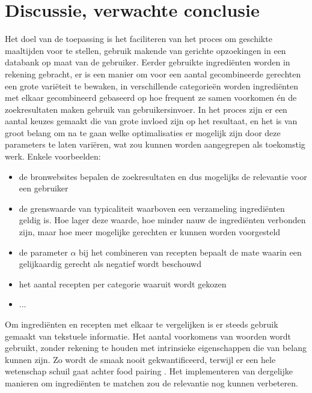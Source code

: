 \documentclass{hogent-article}
\begin{document}
\section{Discussie, verwachte conclusie}%
\label{sec:discussie-conclusie}

Het doel van de toepassing is het faciliteren van het proces om geschikte maaltijden voor te stellen, gebruik makende van gerichte opzoekingen in een databank op maat van de gebruiker. Eerder gebruikte ingrediënten worden in rekening gebracht, er is een manier om voor een aantal gecombineerde gerechten een grote variëteit te bewaken, in verschillende categorieën worden ingrediënten met elkaar gecombineerd gebaseerd op hoe frequent ze samen voorkomen én de zoekresultaten maken gebruik van gebruikersinvoer. In het proces zijn er een aantal keuzes gemaakt die van grote invloed zijn op het resultaat, en het is van groot belang om na te gaan welke optimalisaties er mogelijk zijn door deze parameters te laten variëren, wat zou kunnen worden aangegrepen als toekomstig werk. Enkele voorbeelden:

\begin{itemize}
    \item de bronwebsites bepalen de zoekresultaten en dus mogelijks de relevantie voor een gebruiker
    \item de grenswaarde van typicaliteit \autocite{Yokoi2015} waarboven een verzameling ingrediënten geldig is. Hoe lager deze waarde, hoe minder nauw de ingrediënten verbonden zijn, maar hoe meer mogelijke gerechten er kunnen worden voorgesteld
    \item de parameter $\alpha$ bij het combineren van recepten bepaalt de mate waarin een gelijkaardig gerecht als negatief wordt beschouwd
    \item het aantal recepten per categorie waaruit wordt gekozen
    \item ...
\end{itemize}

Om ingrediënten en recepten met elkaar te vergelijken is er steeds gebruik gemaakt van tekstuele informatie. Het aantal voorkomens van woorden wordt gebruikt, zonder rekening te houden met intrinsieke eigenschappen die van belang kunnen zijn. Zo wordt de smaak nooit gekwantificeerd, terwijl er een hele wetenschap schuil gaat achter food pairing \autocite{Ahn2011}. Het implementeren van dergelijke manieren om ingrediënten te matchen zou de relevantie nog kunnen verbeteren. 



\printbibliography[heading=bibintoc, title={Referenties}] 
\end{document}
